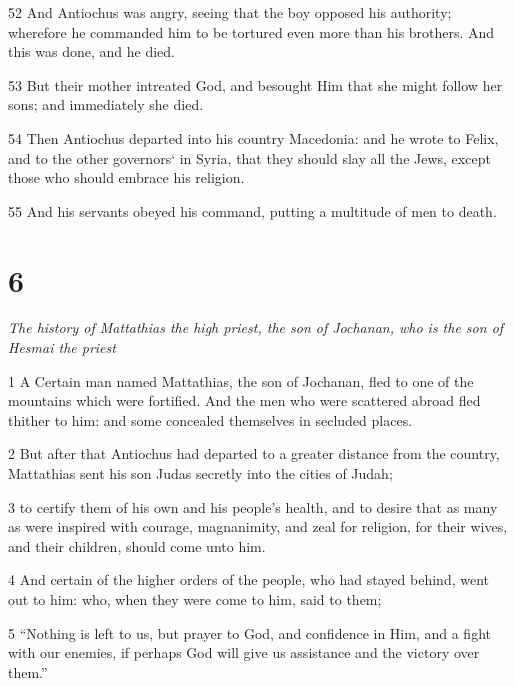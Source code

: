 \par 52 And Antiochus was angry, seeing that the boy opposed his authority; wherefore he commanded him to be tortured even more than his brothers. And this was done, and he died. 

\par 53 But their mother intreated God, and besought Him that she might follow her sons; and immediately she died. 

\par 54 Then Antiochus departed into his country Macedonia: and he wrote to Felix, and to the other governors‘ in Syria, that they should slay all the Jews, except those who should embrace his religion. 

\par 55 And his servants obeyed his command, putting a multitude of men to death. 

\chapter{6}

\par \textit{The history of Mattathias the high priest, the son of Jochanan, who is the son of Hesmai the priest}

\par 1 A Certain man named Mattathias, the son of Jochanan, fled to one of the mountains which were fortified. And the men who were scattered abroad fled thither to him: and some concealed themselves in secluded places. 

\par 2 But after that Antiochus had departed to a greater distance from the country, Mattathias sent his son Judas secretly into the cities of Judah; 

\par 3 to certify them of his own and his people’s health, and to desire that as many as were inspired with courage, magnanimity, and zeal for religion, for their wives, and their children, should come unto him. 

\par 4 And certain of the higher orders of the people, who had stayed behind, went out to him: who, when they were come to him, said to them; 

\par 5 “Nothing is left to us, but prayer to God, and confidence in Him, and a fight with our enemies, if perhaps God will give us assistance and the victory over them.” 

